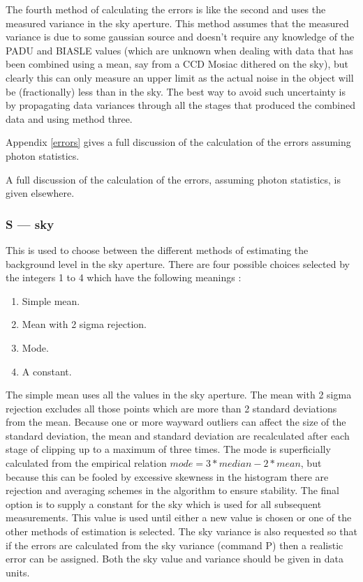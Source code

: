 \documentclass[twoside,11pt]{article}
\newcommand{\htmlref}[2]{#1}
\newenvironment{latexonly}{}{}
\renewcommand{\_}{\texttt{\symbol{95}}}
\begin{document}
The fourth method of calculating the errors is like the second and uses the
measured variance in the sky aperture. This method assumes that the measured
variance is due to some gaussian source and doesn't require any knowledge of 
the PADU and BIASLE values (which are unknown when dealing with data that has
been combined using a mean, say from a CCD Mosiac dithered on the sky), but
clearly this can only measure an upper limit as the actual noise in the
object will be (fractionally) less than in the sky. The best way to avoid 
such uncertainty is by propagating data variances through all the stages that
produced the combined data and using method three.

\begin{latexonly}
Appendix \ref{errors} gives a full discussion of the calculation of
the errors assuming photon statistics.
\end{latexonly}
\begin{htmlonly}
A full discussion of the calculation of
the errors, assuming photon statistics, is given \htmlref{elsewhere}{errors}.
\end{htmlonly}

\subsubsection{S --- sky}

This is used to choose between the different methods of estimating the
background level in the sky aperture. There are four possible choices
selected by the integers 1 to 4 which have the following meanings :
\begin{enumerate}
\item Simple mean.
\item Mean with 2 sigma rejection.
\item Mode.
\item A constant.
\end{enumerate}
The simple mean uses all the values in the sky aperture. The mean with
2 sigma rejection excludes all those points which are more than 2
standard deviations from the mean. Because one or more wayward
outliers can affect the size of the standard deviation, the mean and
standard deviation are recalculated after each stage of clipping up to
a maximum of three times.  The mode is superficially calculated from
the empirical relation
$mode = 3 * median - 2 * mean$, but because this can be fooled by
excessive skewness in the histogram there are rejection and averaging
schemes in the algorithm to ensure stability. The final option is to
supply a constant for the sky which is used for all
subsequent measurements. This value is used until either a new value is
chosen or one of the other methods of estimation is selected. The sky
variance is also requested so that if the errors are calculated from the
sky variance (command P) then a realistic error can be assigned. Both
the sky value and variance should be given in data units.
\end{document}
